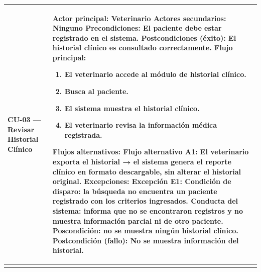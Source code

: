 \documentclass[
]{article}
\newcounter{none} %
\begin{document}
{\def\LTcaptype{none} %
\begin{longtable}[]{|
  >{\raggedright\arraybackslash}p{}|
  >{\raggedright\arraybackslash}p{}|}
\hline
\begin{minipage}[b]{\linewidth}\raggedright
\textbf{CU-03 --- Revisar Historial Clínico}
\end{minipage} & \begin{minipage}[b]{\linewidth}\raggedright
\textbf{Actor principal:} Veterinario \textbf{Actores secundarios:} Ninguno \textbf{Precondiciones:} El
paciente debe estar registrado en el sistema. \textbf{Postcondiciones (éxito):} El historial clínico es consultado
correctamente. \textbf{Flujo principal:}

\begin{enumerate}
\def\labelenumi{\arabic{enumi}.}
\item
  El veterinario accede al módulo de historial clínico.
\item
  Busca al paciente.
\item
  El sistema muestra el historial clínico.
\item
  El veterinario revisa la información médica registrada.
\end{enumerate}

\textbf{Flujos alternativos:} Flujo alternativo A1: El veterinario exporta el historial → el sistema genera el reporte clínico en formato descargable, sin alterar el historial original.
\textbf{Excepciones:} Excepción E1: Condición de disparo: la búsqueda no encuentra un paciente registrado con los criterios ingresados. Conducta del sistema: informa que no se encontraron registros y no muestra información parcial ni de otro paciente. Poscondición: no se muestra ningún historial clínico.
\textbf{Postcondición (fallo):} No se muestra información del historial.
\end{minipage} \\
\hline
\endhead
\hline
\endlastfoot
\end{longtable}
}
\end{document}

